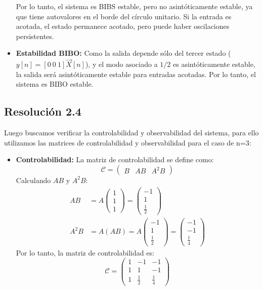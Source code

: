 \documentclass[
  11pt,
  letterpaper,
   addpoints,
   answers
  ]{exam}
\begin{document}
\begin{questions}
\begin{solution}
\begin{itemize}
  Por lo tanto, el sistema es BIBS estable, pero no asintóticamente estable, ya que tiene autovalores en el borde del círculo unitario. Si la entrada es acotada, el estado permanece acotado, pero puede haber oscilaciones persistentes.

  \item \textbf{Estabilidad BIBO:} Como la salida depende sólo del tercer estado ($y[n] = [0\ 0\ 1] \vec{X}[n]$), y el modo asociado a $1/2$ es asintóticamente estable, la salida será asintóticamente estable para entradas acotadas. Por lo tanto, el sistema es BIBO estable.
\end{itemize}
\subsection*{Resolución 2.4}
Luego buscamos verificar la controlabilidad y observabilidad del sistema, para ello utilizamos las matrices de controlabilidad y observabilidad para el caso de n=3:
\begin{itemize}
  \item \textbf{Controlabilidad:} La matriz de controlabilidad se define como:
  \begin{equation}
    \mathcal{C} = \begin{pmatrix} B & AB & A^2B \end{pmatrix}
  \end{equation}
  Calculando $AB$ y $A^2B$:
  \begin{align}
    AB &= A \begin{pmatrix} 1 \\ 1 \\ 1 \end{pmatrix} = \begin{pmatrix} -1 \\ 1 \\ \frac{1}{2} \end{pmatrix} \\
    A^2B &= A(AB) = A\begin{pmatrix} -1 \\ 1 \\ \frac{1}{2} \end{pmatrix} = \begin{pmatrix} -1 \\ -1 \\ \frac{1}{4} \end{pmatrix}
  \end{align}
  Por lo tanto, la matriz de controlabilidad es:
  \begin{equation}
    \mathcal{C} = \begin{pmatrix} 1 & -1 & -1 \\ 1 & 1 & -1 \\ 1 & \frac{1}{2} & \frac{1}{4} \end{pmatrix}

\end{equation}
\end{itemize}
\end{solution}
\end{questions}
\end{document}
